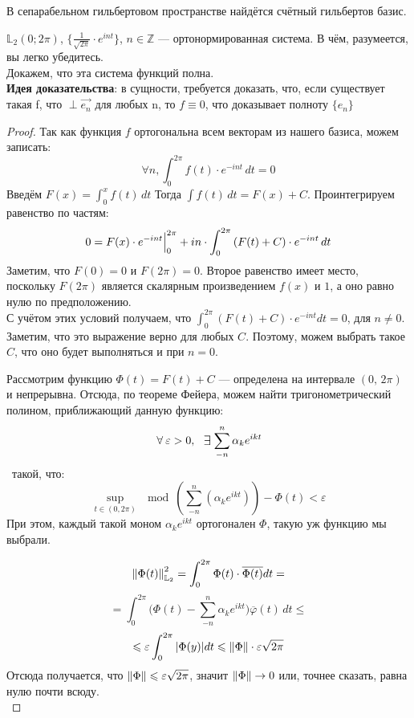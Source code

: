 \documentclass[12pt]{article}
\begin{document}
	\begin{state}
		В сепарабельном гильбертовом пространстве найдётся счётный гильбертов базис.
	\end{state}
	
	\example $\mathbb{L}_2 (0; 2\pi)$, $\{ \frac{1}{\sqrt{2\pi}} \cdot e^{int} \}$, $n \in \mathbb{Z}$ --- ортонормированная система.
	{\color{gray} В чём, разумеется, вы легко убедитесь.}\\
	Докажем, что эта система функций полна.\\
	\textbf{Идея доказательства}: в сущности, требуется доказать, что, если существует такая f, что $\perp \vec{e_n}$
	для любых n, то $f \equiv 0$, что доказывает полноту $\{ e_n \}$
	\begin{proof}
		Так как функция $f$ ортогональна всем векторам из нашего базиса, можем записать:
		$$ \forall n, \int_0^{2\pi} f(t) \cdot e^{-int} \,dt = 0 $$
		Введём $F(x) = \int_0^x f(t) \,dt$ Тогда $\int f(t) \,dt = F(x) + C$. Проинтегрируем равенство по частям:
		$$ 0 = F(x) \cdot e^{-int} \Big|_{0}^{2\pi} 
		   + i n \cdot \int_0^{2\pi} \left(F(t) + C\right) \cdot e^{-int} \,dt $$
		Заметим, что $F(0) = 0$ и $F(2\pi) = 0$. Второе равенство имеет место, поскольку $F(2\pi)$ является 
        скалярным произведением $f(x)$ и $1$, а оно равно нулю по предположению. \\
		С учётом этих условий получаем, что $\int_0^{2\pi} (F(t) + C) \cdot e^{-int} dt = 0$, для $n \neq 0$. 
		Заметим, что это выражение верно для любых $C$. Поэтому, можем выбрать такое $C$, что оно будет
		выполняться и при $n = 0$.
		
		Рассмотрим функцию $\Phi(t) = F(t) + C$ --- определена на интервале $(0,\, 2\pi)$ и непрерывна.
		Отсюда, по теореме Фейера, можем найти тригонометрический полином, приближающий данную функцию:
		$$\forall \varepsilon > 0,\, \:\Exists\! \sum_{-n}^n \alpha_k e^{ikt}$$\
		такой, что:
		$$ \underset{t \in (0,2\pi)}{\sup} \mod{(\sum_{-n}^n (\alpha_k e^{ikt})) - \Phi(t)} < \varepsilon $$
		При этом, каждый такой моном $\alpha_k e^{ikt}$ ортогонален $\Phi$, такую уж функцию мы выбрали.
		
		$$ \left\| \Phi(t) \right\|^2_{\mathbb{L}_2} = \int_0^{2\pi} \Phi(t) \cdot \overline{\Phi(t)} dt = $$
		$$ = \int_0^{2\pi}\Big(\Phi(t) - \sum_{-n}^n \alpha_k e^{ikt}\Big)\overline{\varphi}(t) \,dt \leq $$
		$$ \leqslant \varepsilon \int_0^{2\pi} | \Phi(y) | dt \leqslant \left\| \Phi \right\| \cdot \varepsilon\sqrt{2\pi} $$
		Отсюда получается, что $\left\| \Phi \right\| \leqslant \varepsilon \sqrt{2\pi}$, значит $\left\| \Phi \right\| \rightarrow 0$ или, точнее сказать,
		равна нулю почти всюду.\\
	\end{proof}
	
\end{document}
